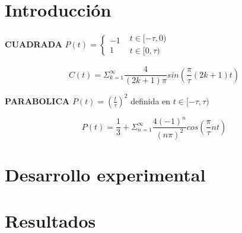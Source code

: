 \documentclass[11pt,a4paper]{article}
\begin{document}
\section{Introducción}\label{sec:intro}

\textbf{CUADRADA} $P(t)=
\left\{\begin{matrix}
-1 \\ 1
\end{matrix}\right.$
$\begin{matrix}
t\in[-\tau,0)\\ t\in[0,\tau)
\end{matrix}$


\begin{equation}
C(t) = \Sigma_{k=1}^{\infty} \frac{4}{(2k+1)\pi}sin(\frac{\pi}{\tau}(2k+1)t)
\end{equation}

\textbf{PARABOLICA} $P(t)=(\frac{t}{\tau})^2$ definida en $t\in[-\tau,\tau)$

\begin{equation}
P(t) = \frac{1}{3} + \Sigma_{n=1}^{\infty} \frac{4(-1)^n}{(n\pi)^2}cos(\frac{\pi}{\tau}nt)
\end{equation}



\section{Desarrollo experimental}





\section{Resultados}
\label{sec:discusion}



\end{document}
